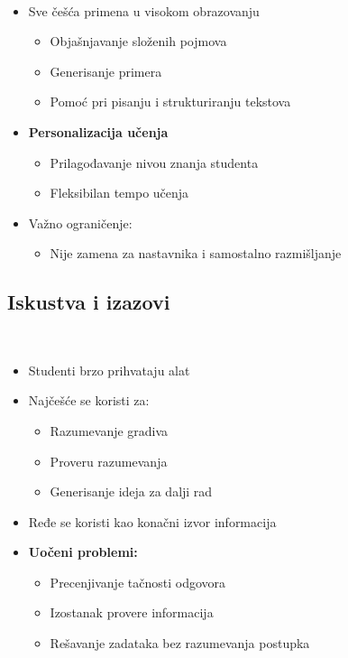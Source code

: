 \documentclass{beamer}
\newcommand{\frametitlesection}{
    \raggedright
    \insertsubsectionhead\\[-2pt]
    {\small \insertsectionhead}
}
\begin{document}
\begin{frame}{\frametitlesection}
\begin{itemize}
    \item Sve češća primena u visokom obrazovanju 
    \begin{itemize}
        \item Objašnjavanje složenih pojmova
        \item Generisanje primera
        \item Pomoć pri pisanju i strukturiranju tekstova
    \end{itemize}
    \item \textbf{Personalizacija učenja} 
    \begin{itemize}
        \item Prilagođavanje nivou znanja studenta
        \item Fleksibilan tempo učenja
    \end{itemize}
    \item Važno ograničenje:
    \begin{itemize}
        \item Nije zamena za nastavnika i samostalno razmišljanje
    \end{itemize}
\end{itemize}
\end{frame}


\subsection{Iskustva i izazovi}

\begin{frame}{\frametitlesection}
\begin{itemize}
    \item Studenti brzo prihvataju alat 
    \item Najčešće se koristi za:
    \begin{itemize}
        \item Razumevanje gradiva
        \item Proveru razumevanja
        \item Generisanje ideja za dalji rad
    \end{itemize}
    \item Ređe se koristi kao konačni izvor informacija
    \item \textbf{Uočeni problemi:}
    \begin{itemize}
        \item Precenjivanje tačnosti odgovora
        \item Izostanak provere informacija
        \item Rešavanje zadataka bez razumevanja postupka
    \end{itemize}
\end{itemize}
\end{frame}
\end{document}
